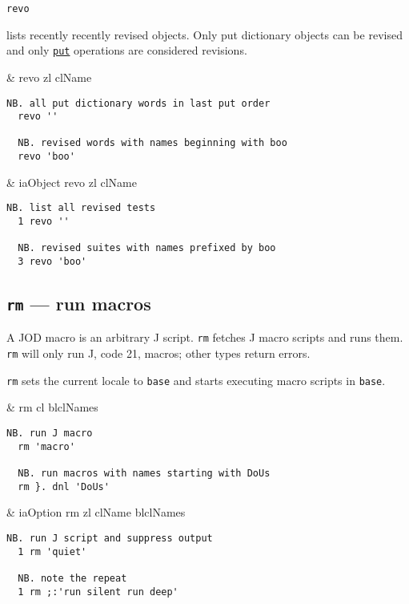 \hypertarget{il:revo}{\texttt{revo}} lists recently recently revised objects. 
Only put dictionary objects can be revised and only 
\hyperlink{il:put}{\texttt{put}} operations are considered revisions. 

\begin{wordhead}
\monad & revo zl \argsep clName \\
\end{wordhead}
\begin{lstlisting}[frame=single,framerule=0pt] 
  NB. all put dictionary words in last put order
  revo ''   
    
  NB. revised words with names beginning with boo  
  revo 'boo'  
\end{lstlisting}  

\begin{wordhead}
\dyad & iaObject revo zl \argsep clName \\
\end{wordhead}
\begin{lstlisting}[frame=single,framerule=0pt] 
  NB. list all revised tests
  1 revo ''  
  
  NB. revised suites with names prefixed by boo 
  3 revo 'boo'  
\end{lstlisting}                  


\subsection{\texttt{rm} --- run macros}\label{ss:rm}
 
A JOD macro is an arbitrary J script.  \hypertarget{il:rm}{\texttt{rm}} 
fetches J macro scripts and runs them. \texttt{rm} will only run J, code 21, macros; other types return errors.  

\texttt{rm} sets the current locale to \texttt{base} and starts 
executing macro scripts in \texttt{base}. 

\begin{wordhead}
\monad & rm cl \argsep blclNames \\
\end{wordhead}
\begin{lstlisting}[frame=single,framerule=0pt] 
  NB. run J macro 
  rm 'macro' 

  NB. run macros with names starting with DoUs
  rm }. dnl 'DoUs' 
\end{lstlisting}   

\begin{wordhead}
\dyad & iaOption rm zl \argsep clName \argsep blclNames \\
\end{wordhead}
\begin{lstlisting}[frame=single,framerule=0pt] 
  NB. run J script and suppress output 
  1 rm 'quiet' 

  NB. note the repeat 
  1 rm ;:'run silent run deep' 
\end{lstlisting}                  


